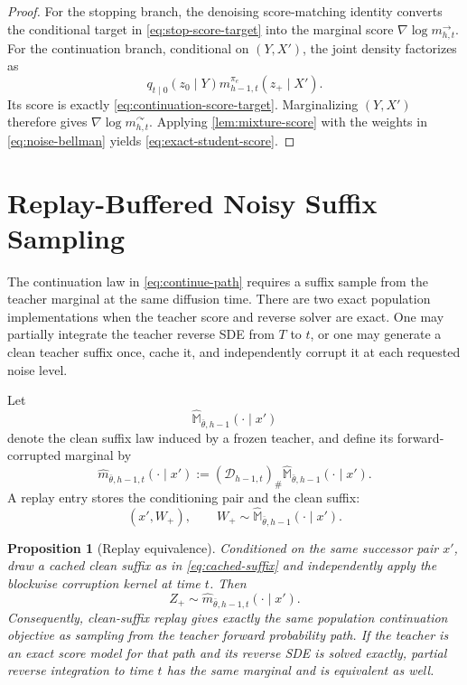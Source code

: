 \documentclass[11pt]{article}
\newtheorem{proposition}[theorem]{Proposition}
\theoremstyle{definition}
\theoremstyle{remark}
\newcommand{\Diff}{\mathcal D}
\newcommand{\Teacher}{\bar\theta}
\newcommand{\targetpi}{\pi_e}
\newcommand{\branchstop}{\rightarrow}
\newcommand{\branchcont}{\curvearrowright}
\begin{document}
\begin{proof}
For the stopping branch, the denoising score-matching identity converts the
conditional target in \cref{eq:stop-score-target} into the marginal score
$\nabla\log m_{h,t}^{\branchstop}$. For the continuation branch, conditional
on $(Y,X')$, the joint density factorizes as
\begin{equation}
q_{t\mid0}(z_0\mid Y)
 m_{h-1,t}^{\targetpi}(z_+\mid X').
\end{equation}
Its score is exactly \cref{eq:continuation-score-target}. Marginalizing
$(Y,X')$ therefore gives $\nabla\log m_{h,t}^{\branchcont}$. Applying
\cref{lem:mixture-score} with the weights in \cref{eq:noise-bellman} yields
\cref{eq:exact-student-score}.
\end{proof}

\section{Replay-Buffered Noisy Suffix Sampling}
\label{sec:replay}

The continuation law in \cref{eq:continue-path} requires a suffix sample from
the teacher marginal at the same diffusion time. There are two exact
population implementations when the teacher score and reverse solver are
exact. One may partially integrate the teacher reverse SDE from $T$ to $t$, or
one may generate a clean teacher suffix once, cache it, and independently
corrupt it at each requested noise level.

Let
\begin{equation}
\widehat{\mathbb M}_{\Teacher,h-1}(\cdot\mid x')
\end{equation}
denote the clean suffix law induced by a frozen teacher, and define its
forward-corrupted marginal by
\begin{equation}
\widehat m_{\Teacher,h-1,t}(\cdot\mid x')
:=
(\Diff_{h-1,t})_{\#}
\widehat{\mathbb M}_{\Teacher,h-1}(\cdot\mid x').
\label{eq:teacher-forward-marginal}
\end{equation}
A replay entry stores the conditioning pair and the clean suffix:
\begin{equation}
(x',W_+),
\qquad
W_+\sim
\widehat{\mathbb M}_{\Teacher,h-1}(\cdot\mid x').
\label{eq:cached-suffix}
\end{equation}

\begin{proposition}[Replay equivalence]
\label{prop:replay-equivalence}
Conditioned on the same successor pair $x'$, draw a cached clean suffix as in
\cref{eq:cached-suffix} and independently apply the blockwise corruption
kernel at time $t$. Then
\begin{equation}
\boxed{
Z_+
\sim
\widehat m_{\Teacher,h-1,t}(\cdot\mid x').
}
\label{eq:replay-equivalence}
\end{equation}
Consequently, clean-suffix replay gives exactly the same population
continuation objective as sampling from the teacher forward probability path.
If the teacher is an exact score model for that path and its reverse SDE is
solved exactly, partial reverse integration to time $t$ has the same marginal
and is equivalent as well.
\end{proposition}
\end{document}
